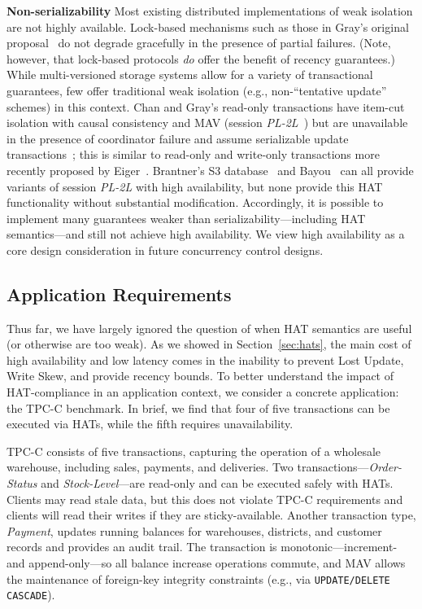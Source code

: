 \vspace{.5em}\noindent\textbf{Non-serializability} Most existing
distributed implementations of weak isolation are not highly
available. Lock-based mechanisms such as those in Gray's original
proposal~\cite{gray-isolation} do not degrade gracefully in the
presence of partial failures. (Note, however, that lock-based
protocols \textit{do} offer the benefit of recency guarantees.) While
multi-versioned storage systems allow for a variety of transactional
guarantees, few offer traditional weak isolation (e.g.,
non-``tentative update'' schemes) in this context.  Chan and Gray's
read-only transactions have item-cut isolation with causal consistency
and MAV (session \textit{PL-2L}~\cite{adya}) but are unavailable in
the presence of coordinator failure and assume serializable update
transactions~\cite{readonly}; this is similar to read-only and
write-only transactions more recently proposed by Eiger~\cite{eiger}.
Brantner's S3 database~\cite{kraska-s3} and
Bayou~\cite{sessionguarantees} can all provide variants of session
\textit{PL-2L} with high availability, but none provide this HAT
functionality without substantial modification. Accordingly, it is
possible to implement many guarantees weaker than
serializability---including HAT semantics---and still not achieve high
availability. We view high availability as a core design consideration
in future concurrency control designs.

\subsection{Application Requirements}

Thus far, we have largely ignored the question of when HAT semantics
are useful (or otherwise are too weak). As we showed in
Section~\ref{sec:hats}, the main cost of high availability and low
latency comes in the inability to prevent Lost Update, Write Skew, and
provide recency bounds. To better understand the impact of
HAT-compliance in an application context, we consider a concrete
application: the TPC-C benchmark. In brief, we find that four of five
transactions can be executed via HATs, while the fifth requires
unavailability.

TPC-C consists of five transactions, capturing the operation of a
wholesale warehouse, including sales, payments, and deliveries. Two
transactions---\textit{Order-Status} and \textit{Stock-Level}---are
read-only and can be executed safely with HATs. Clients may read stale
data, but this does not violate TPC-C requirements and clients will
read their writes if they are sticky-available. Another transaction
type, \textit{Payment}, updates running balances for warehouses,
districts, and customer records and provides an audit trail. The
transaction is monotonic---increment- and append-only---so all balance
increase operations commute, and MAV allows the maintenance of
foreign-key integrity constraints (e.g., via \texttt{UPDATE/DELETE
  CASCADE}).

